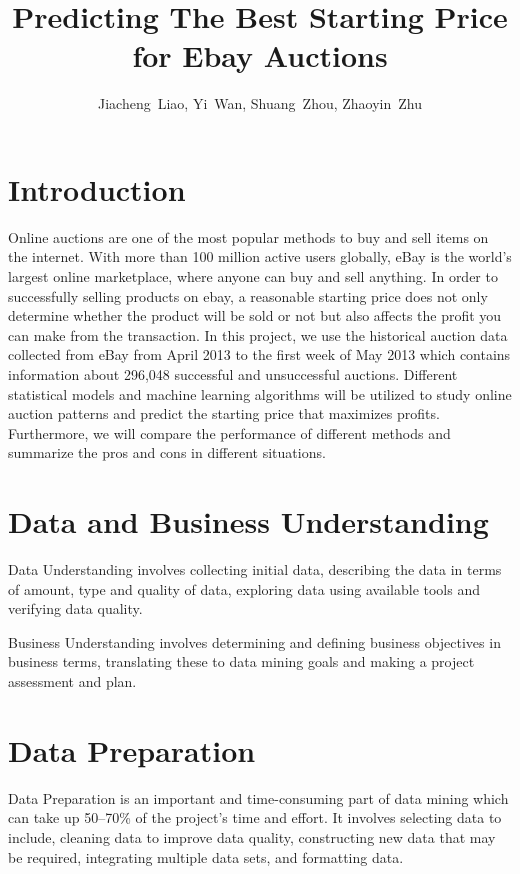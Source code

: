 \documentclass[CEJM,PDF]{cej} %
\title{Predicting The Best Starting Price for Ebay Auctions}
\author{Jiacheng~Liao\inst{1},
        Yi~Wan\inst{1},
        Shuang~Zhou\inst{1},
        Zhaoyin~Zhu\inst{2}
       }
\institute{\inst{1}
           Department of Computer Science, New York University, New York, NY 10012, USA
           \inst{2}
           Division of Biostatistics, NYU School of Medicine, New York, NY 10016, USA
          }
\begin{document}
\maketitle
\section{Introduction }

Online auctions are one of the most popular methods to buy and sell items on the internet. With more than 100 million active users globally, eBay is the world’s largest online marketplace, where anyone can buy and sell anything. In order to successfully selling products on ebay, a reasonable starting price does not only determine whether the product will be sold or not but also affects the profit you can make from the transaction. In this project, we use the historical auction data collected from eBay from April 2013 to the first week of May 2013 which contains information about 296,048 successful and unsuccessful auctions. Different statistical models and machine learning algorithms will be utilized to study online auction patterns and predict the starting price that maximizes profits. Furthermore, we will compare the performance of different methods and summarize the pros and cons in different situations.




\section{Data and Business Understanding}
Data Understanding involves collecting initial data, describing the data in terms of amount, type and quality of data, exploring data using available tools and verifying data quality.


Business Understanding involves determining and defining business objectives in business terms, translating these to data mining goals and making a project assessment and plan.


\section{Data Preparation}

Data Preparation is an important and time-consuming part of data mining which can take up 50–70\% of the project's time and effort. It involves selecting data to include, cleaning data to improve data quality, constructing new data that may be required, integrating multiple data sets, and formatting data.
\end{document}
